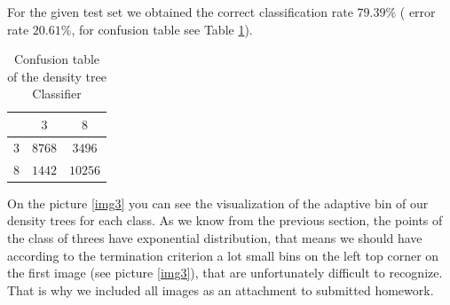 \documentclass{article}
\begin{document}
For the given test set we obtained the correct classification rate $79.39\%$ ( error rate $20.61\%$, for confusion table see Table \ref{Table2}). 

\begin{table}[hbt]
	\centering
	\begin{tabular}{|l|c|c|}
		\hline
		 & $3$ & $8$ \\ \hline
		$3$ & $8768$ & $3496$  \\ 
		$8$ & $1442$ & $10256$ \\ \hline 
	\end{tabular}
\caption{Confusion table of the density tree Classifier}
\label{Table2}
\end{table}
\FloatBarrier

On the picture \ref{img3} you can see the visualization of the adaptive bin of our density trees for each class. As we know from the previous section, the points of the class of threes have exponential distribution, that means we should have according to the termination criterion a lot small bins on the left top corner on the first image (see picture \ref{img3}), that are unfortunately difficult to recognize. That is why we included all images as an attachment to submitted homework.
\end{document}
